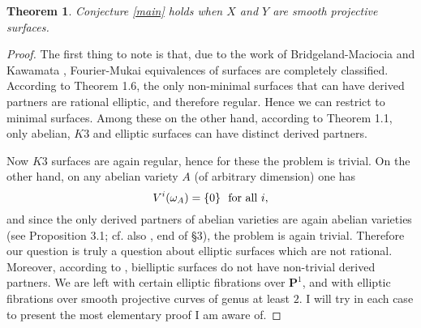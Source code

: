 \documentclass{amsart}
\theoremstyle{plain}
\newtheorem{theorem}{Theorem}[section]
\theoremstyle{definition}
\numberwithin{equation}{section}
\begin{document}
\begin{theorem}\label{surfaces}
Conjecture \ref{main} holds when $X$ and $Y$ are smooth projective surfaces.
\end{theorem}
\begin{proof}
The first thing to note is that, due to the work of Bridgeland-Maciocia \cite{bm} and Kawamata \cite{kawamata}, 
Fourier-Mukai equivalences of surfaces are completely classified. According to \cite{kawamata} Theorem 1.6, the only non-minimal 
surfaces that can have derived partners are rational elliptic, and therefore regular. Hence we can restrict to minimal surfaces. Among these on the other hand, 
according to \cite{bm} Theorem 1.1, only abelian, $K3$ and elliptic surfaces can have distinct derived partners. 

Now $K3$ surfaces are again regular, hence for these the problem is trivial. On the other hand, on any abelian variety $A$ (of arbitrary dimension) one has 
$$V^i (\omega_A) = \{ 0\} \,\,\,\, {\rm for ~all~} i,$$
and since the only derived partners of abelian varieties are again abelian varieties (see \cite{hn} Proposition 3.1; cf. also \cite{PS}, end of \S3), the problem is again trivial. Therefore our question is truly a question about elliptic surfaces which are not rational. Moreover, according to \cite{bm}, bielliptic surfaces do not have non-trivial derived partners. We are 
left with certain elliptic fibrations over ${{ \mathbf{P}}}^1$, and with elliptic fibrations over smooth projective curves of genus at least $2$. I will try in each case to present the most
elementary proof I am aware of.


\end{proof}
\end{document}
